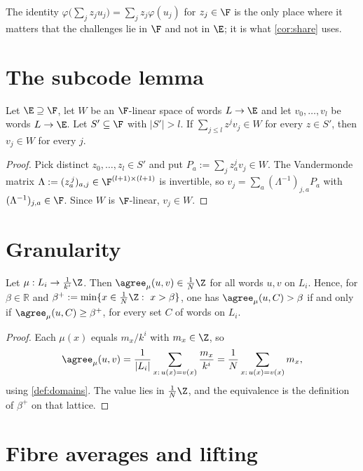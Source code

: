 \begin{remark}
The identity $\varphi\big(\sum_jz_ju_j\big)=\sum_jz_j\varphi(u_j)$ for $z_j\in\F$ is the only place
where it matters that the challenges lie in $\F$ and not in $\E$; it is what \ref{cor:share} uses.
\end{remark}

\section{The subcode lemma}

\begin{lemma}\label{lem:subcode}
Let $\E\supseteq\F$, let $W$ be an $\F$-linear space of words $L\to\E$ and let $v_0,\dots,v_l$ be
words $L\to\E$. Let $S'\subseteq\F$ with $|S'|>l$. If $\sum_{j\le l}z^jv_j\in W$ for every
$z\in S'$, then $v_j\in W$ for every $j$.
\end{lemma}

\begin{proof}
Pick distinct $z_0,\dots,z_l\in S'$ and put $P_a:=\sum_jz_a^jv_j\in W$. The Vandermonde
matrix $\Lambda:=(z_a^{\,j})_{a,j}\in\F^{(l+1)\times(l+1)}$ is invertible, so
$v_j=\sum_a(\Lambda^{-1})_{j,a}P_a$ with $(\Lambda^{-1})_{j,a}\in\F$. Since $W$ is $\F$-linear,
$v_j\in W$.
\end{proof}

\section{Granularity}

\begin{lemma}[Granularity]\label{lem:gran}
Let $\mu:L_i\to\frac1{k^i}\Z$. Then $\agree_\mu(u,v)\in\frac1N\Z$ for all words
$u,v$ on $L_i$. Hence, for $\beta\in\mathbb R$ and
$\beta^+:=\min\{x\in\frac1N\Z:\ x>\beta\}$, one has $\agree_\mu(u,C)>\beta$ if and only if
$\agree_\mu(u,C)\ge\beta^+$, for every set $C$ of words on $L_i$.
\end{lemma}

\begin{proof}
Each $\mu(x)$ equals $m_x/k^i$ with $m_x\in\Z$, so
\[
\agree_\mu(u,v)=\frac1{|L_i|}\sum_{x:\,u(x)=v(x)}\frac{m_x}{k^i}=\frac1N\sum_{x:\,u(x)=v(x)}m_x,
\]
using \ref{def:domains}. The value lies in $\frac1N\Z$, and the equivalence is the definition of
$\beta^+$ on that lattice.
\end{proof}

\section{Fibre averages and lifting}

